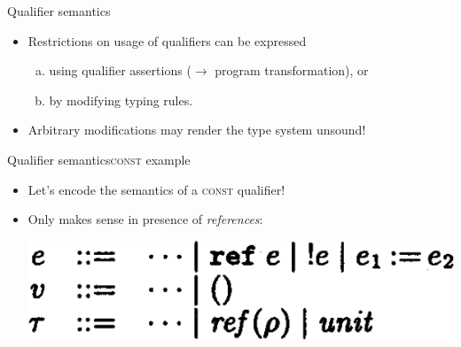 \documentclass{beamer}
\begin{document}


\begin{frame}{Qualifier semantics}
  \begin{itemize}
  \item Restrictions on usage of qualifiers can be expressed
    \begin{enumerate}[a)]
    \item using qualifier assertions ($\rightarrow$ program transformation), or
    \item by modifying typing rules.
    \end{enumerate}
  \item Arbitrary modifications may render the type system unsound!
  \end{itemize}
\end{frame}

\begin{frame}{Qualifier semantics}{\textsc{const} example}
  \begin{itemize}
  \item Let's encode the semantics of a \textsc{const} qualifier!
  \item<2-> Only makes sense in presence of \emph{references}:
    \begin{center}
    \includegraphics[scale=0.3]{paper_ref_syntax.png}
    \end{center}
  \end{itemize}
\end{frame}

\end{document}
